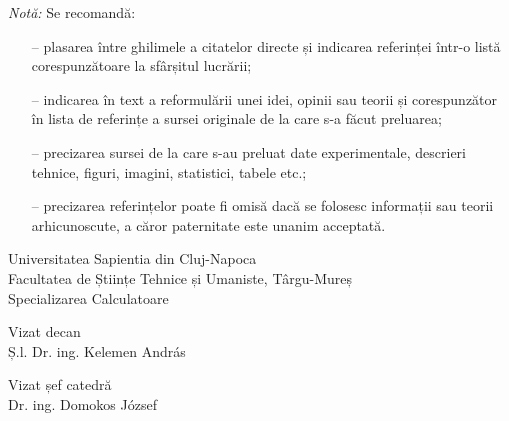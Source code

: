 	\vspace{\fill}
	
	\noindent\emph{Notă:} Se recomandă:
	
	\begin{itemize}
		\item[--] plasarea între ghilimele a citatelor directe și indicarea referinței într-o listă corespunzătoare la sfârșitul lucrării;
		\item[--] indicarea în text a reformulării unei idei, opinii sau teorii și corespunzător în lista de referințe a sursei originale de la care s-a făcut preluarea;
		\item[--] precizarea sursei de la care s-au preluat date experimentale, descrieri tehnice, figuri, imagini, statistici, tabele etc.;
		\item[--] precizarea referințelor poate fi omisă dacă se folosesc informații sau teorii arhicunoscute, a căror paternitate este unanim acceptată.
	\end{itemize}
	
\newpage

	\begin{center}
		{\Large Universitatea Sapientia din Cluj-Napoca}\\\vspace{0.07in}
		{\Large Facultatea de Științe Tehnice și Umaniste, Târgu-Mureș}\\\vspace{0.07in}
		{\Large Specializarea Calculatoare}\\
	\end{center}
	
	\vspace{3cm}
	
	\begin{multicols}{2}
		\begin{center}
			Vizat decan\\
			Ș.l. Dr. ing. Kelemen András
		\end{center}
		\columnbreak
		\begin{center}
			Vizat șef catedră\\
			Dr. ing. Domokos József
		\end{center}
	\end{multicols}
